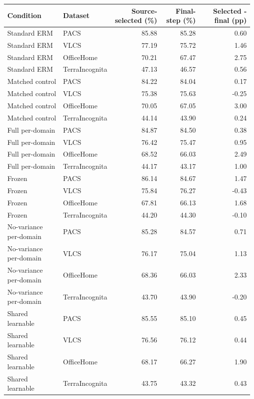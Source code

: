 \begin{tabular}{llrrr}
\toprule
Condition & Dataset & Source-selected (\%) & Final-step (\%) & Selected - final (pp) \\
\midrule
Standard ERM & PACS & 85.88 & 85.28 & 0.60 \\
Standard ERM & VLCS & 77.19 & 75.72 & 1.46 \\
Standard ERM & OfficeHome & 70.21 & 67.47 & 2.75 \\
Standard ERM & TerraIncognita & 47.13 & 46.57 & 0.56 \\
Matched control & PACS & 84.22 & 84.04 & 0.17 \\
Matched control & VLCS & 75.38 & 75.63 & -0.25 \\
Matched control & OfficeHome & 70.05 & 67.05 & 3.00 \\
Matched control & TerraIncognita & 44.14 & 43.90 & 0.24 \\
Full per-domain & PACS & 84.87 & 84.50 & 0.38 \\
Full per-domain & VLCS & 76.42 & 75.47 & 0.95 \\
Full per-domain & OfficeHome & 68.52 & 66.03 & 2.49 \\
Full per-domain & TerraIncognita & 44.17 & 43.17 & 1.00 \\
Frozen & PACS & 86.14 & 84.67 & 1.47 \\
Frozen & VLCS & 75.84 & 76.27 & -0.43 \\
Frozen & OfficeHome & 67.81 & 66.13 & 1.68 \\
Frozen & TerraIncognita & 44.20 & 44.30 & -0.10 \\
No-variance per-domain & PACS & 85.28 & 84.57 & 0.71 \\
No-variance per-domain & VLCS & 76.17 & 75.04 & 1.13 \\
No-variance per-domain & OfficeHome & 68.36 & 66.03 & 2.33 \\
No-variance per-domain & TerraIncognita & 43.70 & 43.90 & -0.20 \\
Shared learnable & PACS & 85.55 & 85.10 & 0.45 \\
Shared learnable & VLCS & 76.56 & 76.12 & 0.44 \\
Shared learnable & OfficeHome & 68.17 & 66.27 & 1.90 \\
Shared learnable & TerraIncognita & 43.75 & 43.32 & 0.43 \\
\bottomrule
\end{tabular}
